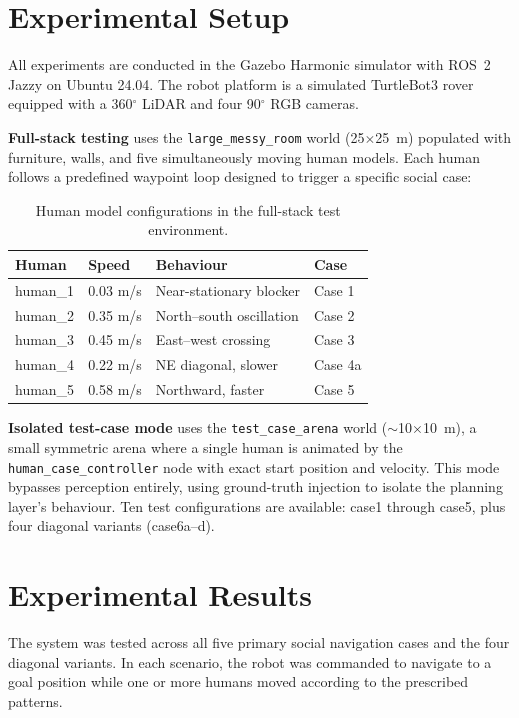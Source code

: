 \documentclass[a4paper]{article}
\begin{document}
\section{Experimental Setup}

All experiments are conducted in the Gazebo Harmonic simulator with ROS~2 Jazzy on Ubuntu 24.04. The robot platform is a simulated TurtleBot3 rover equipped with a 360$^\circ$ LiDAR and four 90$^\circ$ RGB cameras.

\textbf{Full-stack testing} uses the \texttt{large\_messy\_room} world (25$\times$25~m) populated with furniture, walls, and five simultaneously moving human models. Each human follows a predefined waypoint loop designed to trigger a specific social case:

\begin{table}[h]
\centering
\small
\begin{tabular}{@{}llll@{}}
\toprule
\textbf{Human} & \textbf{Speed} & \textbf{Behaviour} & \textbf{Case} \\
\midrule
human\_1 & 0.03 m/s & Near-stationary blocker & Case 1 \\
human\_2 & 0.35 m/s & North--south oscillation & Case 2 \\
human\_3 & 0.45 m/s & East--west crossing & Case 3 \\
human\_4 & 0.22 m/s & NE diagonal, slower & Case 4a \\
human\_5 & 0.58 m/s & Northward, faster & Case 5 \\
\bottomrule
\end{tabular}
\caption{Human model configurations in the full-stack test environment.}
\label{tab:humans}
\end{table}

\textbf{Isolated test-case mode} uses the \texttt{test\_case\_arena} world ($\sim$10$\times$10~m), a small symmetric arena where a single human is animated by the \texttt{human\_case\_controller} node with exact start position and velocity. This mode bypasses perception entirely, using ground-truth injection to isolate the planning layer's behaviour. Ten test configurations are available: case1 through case5, plus four diagonal variants (case6a--d).


\section{Experimental Results}

The system was tested across all five primary social navigation cases and the four diagonal variants. In each scenario, the robot was commanded to navigate to a goal position while one or more humans moved according to the prescribed patterns.
\end{document}
